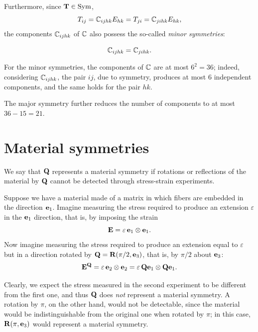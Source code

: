 Furthermore, since $\mathbf{T} \in \operatorname{Sym}$,
\begin{equation}
	T_{ij} = \mathbb{C}_{ijhk} E_{hk} = T_{ji} = \mathbb{C}_{jihk} E_{hk},
\end{equation}
the components $\mathbb{C}_{ijhk}$ of $\mathbb{C}$ also possess the so-called \textit{minor symmetries}:

\begin{definition}
	\begin{equation}
		\mathbb{C}_{ijhk} = \mathbb{C}_{jihk}.
	\end{equation}
\end{definition}

For the minor symmetries, the components of $\mathbb{C}$ are at most $6^2 = 36$; indeed, considering $\mathbb{C}_{ijhk}$, the pair $ij$, due to symmetry, produces at most 6 independent components, and the same holds for the pair $hk$.

The major symmetry further reduces the number of components to at most $36 - 15 = 21$.


\section{Material symmetries}
We say that $\mathbf{Q}$ represents a material symmetry if rotations or reflections of the material by $\mathbf{Q}$ cannot be detected through stress-strain experiments.

Suppose we have a material made of a matrix in which fibers are embedded in the direction $\mathbf{e}_1$. Imagine measuring the stress required to produce an extension $\varepsilon$ in the $\mathbf{e}_1$ direction, that is, by imposing the strain
\begin{equation}
	\mathbf{E} =\varepsilon\,\mathbf{e}_1\otimes\mathbf{e}_1.
\end{equation}
Now imagine measuring the stress required to produce an extension equal to $\varepsilon$ but in a direction rotated by $\mathbf{Q}=\mathbf{R} (\pi/2, \mathbf{e}_3)$, that is, by $\pi/2$ about $\mathbf{e}_3$:
\begin{equation}
	\mathbf{E} ^{\mathbf{Q}} =\varepsilon\, \mathbf{e}_2 \otimes \mathbf{e}_2= \varepsilon\,\mathbf{Q} \mathbf{e}_1 \otimes \mathbf{Q} \mathbf{e}_1.
\end{equation}

Clearly, we expect the stress measured in the second experiment to be different from the first one, and thus $\mathbf{Q}$ does \textit{not} represent a material symmetry. A rotation by $\pi$, on the other hand, would not be detectable, since the material would be indistinguishable from the original one when rotated by $\pi$; in this case, $\mathbf{R}(\pi, \mathbf{e}_3)$ would represent a material symmetry.

